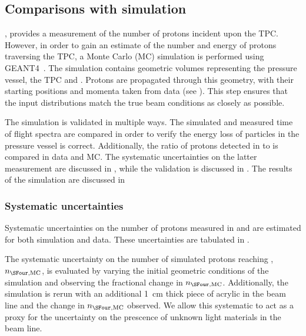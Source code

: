 \subsection{Comparisons with simulation}
\label{sec:hptpc_beam_flux:results:MCData}

, provides a measurement of the number of protons incident upon the TPC.
However, in order to gain an estimate of the number and energy of protons traversing the TPC, a Monte Carlo (MC) simulation is performed using GEANT4~\cite{geant}.
The simulation contains geometric volumes representing the pressure vessel, the TPC and \SFour.
Protons are propagated through this geometry, with their starting positions and momenta taken from \SThree data (see ).
This step ensures that the input distributions match the true beam conditions as closely as possible.

The simulation is validated in multiple ways.
The simulated and measured time of flight spectra are compared in order to verify the energy loss of particles in the pressure vessel is correct.
Additionally, the ratio of protons detected in \SThree to \SFour is compared in data and MC.
The systematic uncertainties on the latter measurement are discussed in , while the validation is discussed in .
The results of the simulation are discussed in 

\subsubsection{Systematic uncertainties}
\label{sec:hptpc_beam_flux:results:MCData:systs}

Systematic uncertainties on the number of protons measured in \SThree and \SFour are estimated for both simulation and data.
These uncertainties are tabulated in .

The systematic uncertainty on the number of simulated protons reaching \SFour, $n_{\SFour,\text{MC}}$, is evaluated by varying the initial geometric conditions of the simulation and observing the fractional change in $n_{\SFour,\text{MC}}$.
Additionally, the simulation is rerun with an additional \SI{1}{\centi\metre} thick piece of acrylic in the beam line and the change in $n_{\SFour,\text{MC}}$ observed.
We allow this systematic to act as a proxy for the uncertainty on the prescence of unknown light materials in the beam line.


